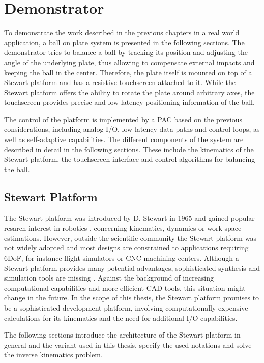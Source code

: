 \chapter{Demonstrator}
\label{sec:demo}

To demonstrate the work described in the previous chapters in a real world
application, a ball on plate system is presented in the following sections.
The demonstrator tries to balance a ball by tracking its position and
adjusting the angle of the underlying plate, thus allowing to compensate
external impacts and keeping the ball in the center. Therefore, the plate
itself is mounted on top of a Stewart platform and has a resistive touchscreen
attached to it. While the Stewart platform offers the ability to rotate the
plate around arbitrary axes, the touchscreen provides precise and low latency
positioning information of the ball.

The control of the platform is implemented by a \ac{PAC} based on the previous
considerations, including analog I/O, low latency data paths and control
loops, as well as self-adaptive capabilities. The different components of the
system are described in detail in the following sections. These include the
kinematics of the Stewart platform, the touchscreen interface and control
algorithms for balancing the ball.

\section{Stewart Platform}
The Stewart platform was introduced by D. Stewart in 1965 \citep{Ste65} and
gained popular resarch interest in robotics \citep{Szu13}, concerning
kinematics, dynamics or work space estimations. However, outside the
scientific community the Stewart platform was not widely adopted and most
designs are constrained to applications requiring \ac{6DoF}, for instance
flight simulators or \ac{CNC} machining centers. Although a Stewart platform
provides many potential advantages, sophisticated synthesis and simulation
tools are missing \citep{Ji96}. Against the background of increasing
computational capabilities and more efficient \ac{CAD} tools, this situation
might change in the future. In the scope of this thesis, the Stewart platform
promises to be a sophisticated development platform, involving computationally
expensive calculations for its kinematics and the need for additional I/O
capabilities.

The following sections introduce the architecture of the Stewart platform in
general and the variant used in this thesis, specify the used notations and
solve the inverse kinematics problem.

